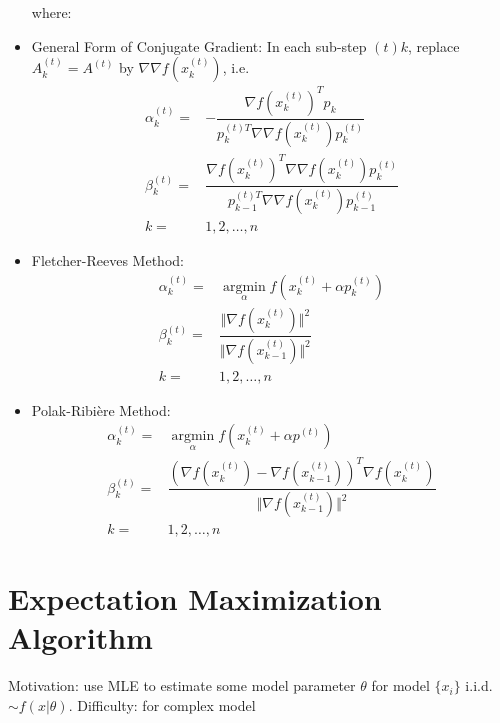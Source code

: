 \begin{itemize}[topsep=2pt,itemsep=0pt]
    where:
    \item General Form of Conjugate Gradient: In each sub-step $ (t)k $, replace $ A^{(t)}_k=A^{(t)} $ by $ \nabla\nabla f\left(x^{(t)}_k\right) $, i.e.
    \begin{align}
        \alpha _{k}^{(t)}=&-\dfrac{\nabla f(x^{(t)}_k)^Tp _k}{p^{(t)T} _{k}\nabla\nabla f(x^{(t)}_{k})p ^{(t)}_{k}}\\
        \beta _k^{(t)}=&\dfrac{\nabla f(x_k^{(t)})^T\nabla\nabla f(x_k^{(t)})p_k^{(t)}}{p^{(t)T} _{k-1}\nabla\nabla f(x^{(t)}_k)p ^{(t)}_{k-1}}\\
        k=&1,2,\ldots ,n
    \end{align}
    
    \item Fletcher-Reeves Method:
    \begin{align}
        \alpha _k^{(t)}=&\mathop{\arg\min}\limits_{\alpha }f\left(x^{(t)}_k+\alpha p^{(t)}_k\right) \\
        \beta _k^{(t)}=&\dfrac{\Vert \nabla f(x_k^{(t)}) \Vert^2 }{ \Vert \nabla f(x_{k-1}^{(t)}) \Vert ^2}\\
        k=&1,2,\ldots ,n
    \end{align}
    \item Polak-Ribi\`ere Method:
    \begin{align}
        \alpha _k^{(t)}=&\mathop{\arg\min}\limits_{\alpha }f\left(x^{(t)}_k+\alpha p^{(t)}\right)\\
        \beta_k^{(t)}=&\dfrac{\left(\nabla f(x_k^{(t)})-\nabla f(x_{k-1}^{(t)})\right)^T\nabla f(x_k^{(t)})}{\Vert \nabla f(x_{k-1}^{(t)}) \Vert^2 }\\
        k=&1,2,\ldots ,n
    \end{align}
        
\end{itemize}

    








\section{Expectation Maximization Algorithm}\label{SubSectionExpectationMaximumAlgorithm}
    Motivation: use MLE to estimate some model parameter $ \theta  $ for model $ \{x_i\}$ i.i.d. $ \sim f(x|\theta ) $. Difficulty: for complex model

